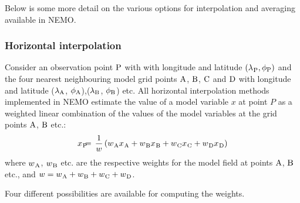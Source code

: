\documentclass[../tex_main/NEMO_manual]{subfiles}
\begin{document}
Below is some more detail on the various options for interpolation and averaging available in NEMO.

\subsubsection{Horizontal interpolation}
Consider an observation point ${\rm P}$ with with longitude and latitude $({\lambda_{}}_{\rm P}, \phi_{\rm P})$ and
the four nearest neighbouring model grid points ${\rm A}$, ${\rm B}$, ${\rm C}$ and ${\rm D}$ with
longitude and latitude ($\lambda_{\rm A}$, $\phi_{\rm A}$),($\lambda_{\rm B}$, $\phi_{\rm B}$) etc.
All horizontal interpolation methods implemented in NEMO estimate the value of a model variable $x$ at point $P$ as
a weighted linear combination of the values of the model variables at the grid points ${\rm A}$, ${\rm B}$ etc.:
\begin{align}
{x_{}}_{\rm P} & \hspace{-2mm} = \hspace{-2mm} & 
\frac{1}{w} \left( {w_{}}_{\rm A} {x_{}}_{\rm A} + 
                   {w_{}}_{\rm B} {x_{}}_{\rm B} + 
                   {w_{}}_{\rm C} {x_{}}_{\rm C} + 
                   {w_{}}_{\rm D} {x_{}}_{\rm D} \right)
\end{align}
where ${w_{}}_{\rm A}$, ${w_{}}_{\rm B}$ etc. are the respective weights for the model field at
points ${\rm A}$, ${\rm B}$ etc., and $w = {w_{}}_{\rm A} + {w_{}}_{\rm B} + {w_{}}_{\rm C} + {w_{}}_{\rm D}$.

Four different possibilities are available for computing the weights.
\end{document}
